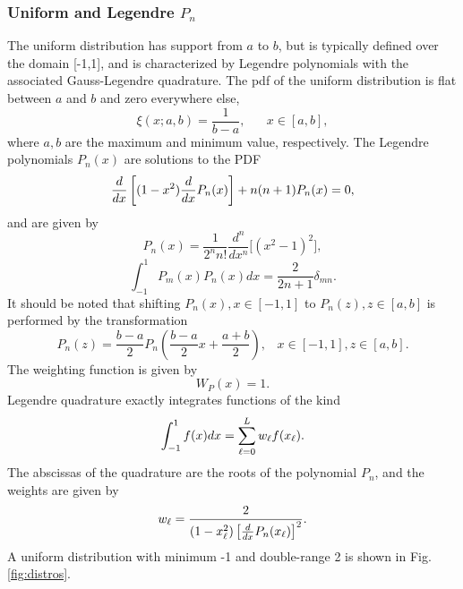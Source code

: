 \newpage
\subsubsection{Uniform and Legendre $P_n$}
The uniform distribution has support from $a$ to $b$, but is typically defined over the domain [-1,1], and is characterized by Legendre polynomials with the associated Gauss-Legendre quadrature.  The pdf of the uniform distribution is flat between $a$ and $b$ and zero everywhere else,
\begin{equation}
\xi(x;a,b)=\frac{1}{b-a},\hspace{20pt}x\in[a,b],
\end{equation}
where $a,b$ are the maximum and minimum value, respectively.  The Legendre polynomials $P_n(x)$ are solutions to the PDF
\begin{equation}
\frac{d }{d x}\left[(1-x^2)\frac{d }{d x}P_n(x)\right]+n(n+1)P_n(x)=0,
\end{equation}
and are given by
\begin{equation}
P_n(x)=\frac{1}{2^nn!}\frac{d^n}{dx^n}\big[(x^2-1)^2\big],
\end{equation}
\begin{equation}
\int_{-1}^{1} P_m(x)P_n(x)dx=\frac{2}{2n+1}\delta_{mn}.
\end{equation}
It should be noted that shifting $P_n(x),x\in[-1,1]$ to $P_n(z),z\in[a,b]$ is performed by the transformation
\begin{equation}
P_n(z)=\frac{b-a}{2}P_n\left(\frac{b-a}{2}x+\frac{a+b}{2}\right),\hspace{10pt}x\in[-1,1],z\in[a,b].
\end{equation}
The weighting function is given by
\begin{equation}
W_{P}(x)=1.
\end{equation}
Legendre quadrature exactly integrates functions of the kind
\begin{equation}
\int_{-1}^1 f(x)dx=\sum_{\ell=0}^L w_\ell f(x_\ell).
\end{equation}
The abscissas of the quadrature are the roots of the polynomial $P_n$, and the weights are given by
\begin{equation}
w_\ell=\frac{2}{(1-x_\ell^2)\left[\frac{d }{d x}P_n(x_\ell)\right]^2}.
\end{equation}
A uniform distribution with minimum -1 and double-range 2 is shown in Fig. \ref{fig:distros}.

\newpage
